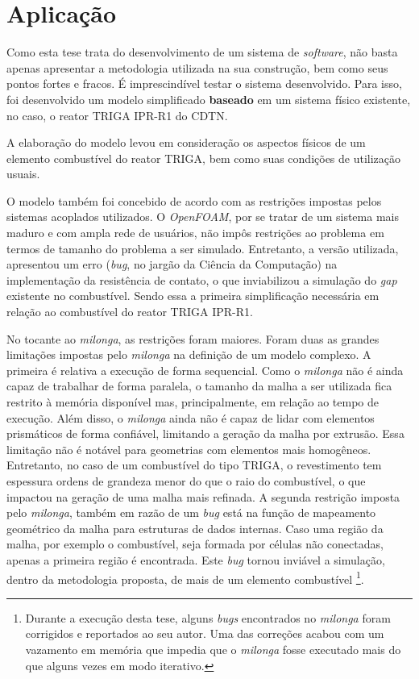 \chapter{Aplicação}
\label{chap:aplicacao}

Como esta tese trata do desenvolvimento de um sistema de \textit{software}, não basta apenas
apresentar a metodologia utilizada na sua construção, bem como seus pontos fortes e fracos. É
imprescindível testar o sistema desenvolvido. Para isso, foi desenvolvido um modelo simplificado
\textbf{baseado} em um sistema físico existente, no caso, o reator TRIGA IPR-R1 do CDTN.

A elaboração do modelo levou em consideração os aspectos físicos de um elemento combustível do
reator TRIGA, bem como suas condições de utilização usuais.

O modelo também foi concebido de acordo com as restrições impostas pelos sistemas acoplados utilizados.
O \textit{OpenFOAM}, por se tratar de um sistema mais maduro e com ampla rede de usuários, não impôs
restrições ao problema em termos de tamanho do problema a ser simulado. Entretanto, a versão utilizada,
apresentou um erro (\textit{bug}, no jargão da Ciência da Computação) na implementação da resistência
de contato, o que inviabilizou a simulação do \textit{gap} existente no combustível. Sendo essa a
primeira simplificação necessária em relação ao combustível do reator TRIGA IPR-R1.

No tocante ao \textit{milonga}, as restrições foram maiores. Foram duas as grandes limitações impostas
pelo \textit{milonga} na definição de um modelo complexo. A primeira é relativa a execução de forma
sequencial. Como o \textit{milonga} não é ainda capaz de trabalhar de forma paralela, o tamanho da malha a ser
utilizada fica restrito à memória disponível mas, principalmente, em relação ao tempo de execução. Além disso,
o \textit{milonga} ainda não é capaz de lidar com elementos prismáticos de forma confiável, limitando a
geração da malha por extrusão. Essa limitação não é notável para geometrias com elementos mais homogêneos.
Entretanto, no caso de um combustível do tipo TRIGA, o revestimento tem espessura ordens de grandeza
menor do que o raio do combustível, o que impactou na geração de uma malha mais refinada. A segunda
restrição imposta pelo \textit{milonga}, também em razão de um \textit{bug} está na função de mapeamento
geométrico da malha para estruturas de dados internas. Caso uma região da malha, por exemplo o combustível,
seja formada por células não conectadas, apenas a primeira região é encontrada. Este \textit{bug} tornou
inviável a simulação, dentro da metodologia proposta, de mais de um elemento combustível
\footnote{Durante a execução desta tese, alguns \textit{bugs} encontrados no \textit{milonga} foram corrigidos e
  reportados ao seu autor. Uma das correções acabou com um vazamento em memória que impedia que o \textit{milonga}
  fosse executado mais do que alguns vezes em modo iterativo.}.

